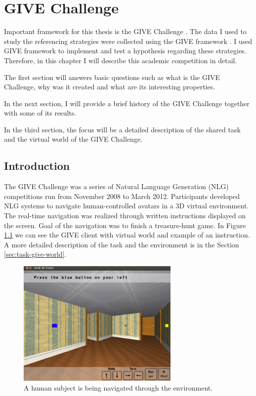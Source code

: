 \chapter{GIVE Challenge}
\label{chap:give-challenge}
Important framework for this thesis is the GIVE Challenge \citep{koller2010first}. The data I used to study the referencing strategies were collected using the GIVE framework \citep{koller2010first}. I used GIVE framework to implement and test a hypothesis regarding these strategies. Therefore, in this chapter I will describe this academic competition in detail.  

The first section will answers basic questions such as what is the GIVE Challenge, why was it created and what are its interesting properties. 

In the next section, I will provide a brief history of the GIVE Challenge together with some of its results. 

In the third section, the focus will be a detailed description of the shared task and the virtual world of the GIVE Challenge.

\section{Introduction}
The GIVE Challenge was a series of Natural Language Generation (NLG) competitions run from November 2008 to March 2012. Participants developed NLG systems to navigate human-controlled avatars in a 3D virtual environment. The real-time navigation was realized through written instructions displayed on the screen. Goal of the navigation was to finish a treasure-hunt game. In Figure \ref{fig:give-client} we can see the GIVE client with virtual world and example of an instruction. A more detailed description of the task and the environment is in the Section \ref{sec:task-give-world}.

\begin{figure}[!htbp]
  \centering
	\includegraphics[width=0.7\textwidth]{Images/give-client}
	\caption{A human subject is being navigated through the environment.}
	\label{fig:give-client}
\end{figure}

